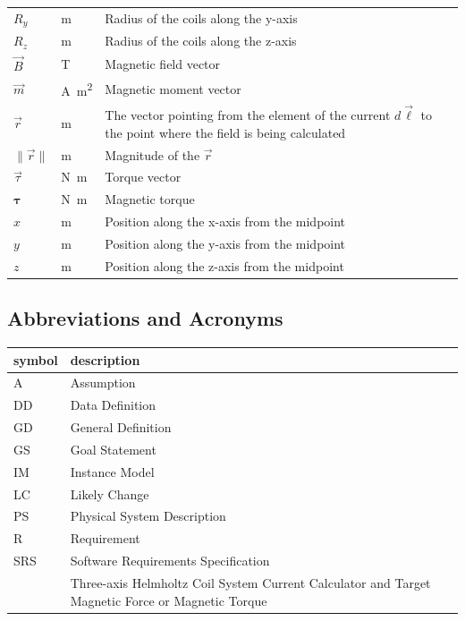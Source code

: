 \documentclass[12pt]{article}
\begin{document}
\begin{longtable*}{l l p{12cm}}
$R_y$ & \si[per-mode=symbol]{\metre} & Radius of the coils along the y-axis \\
$R_z$ & \si[per-mode=symbol]{\metre} & Radius of the coils along the z-axis \\
$\vec{B}$ & \si[per-mode=symbol]{\tesla} & Magnetic field vector \\
$\vec{m}$ & \si[per-mode=symbol]{\ampere\square\meter} & Magnetic moment vector \\
$\vec{r}$ & \si[per-mode=symbol]{\meter} & The vector pointing from the element of the current $d\vec{\ell}$ to the point where the field is being calculated \\
$\|\vec{r}\|$  & \si[per-mode=symbol]{\meter} & Magnitude of the $\vec{r}$ \\
$\vec{\tau}$ & \si[per-mode=symbol]{\newton\meter} & Torque vector \\
$\mathbf{\tau}$ & \si[per-mode=symbol]{\si{\newton\meter}} & Magnetic torque \\
$x$ & \si[per-mode=symbol]{\metre} & Position along the x-axis from the midpoint \\
$y$ & \si[per-mode=symbol]{\metre} & Position along the y-axis from the midpoint \\
$z$ & \si[per-mode=symbol]{\metre} & Position along the z-axis from the midpoint \\

\bottomrule
\end{longtable*}


\subsection{Abbreviations and Acronyms}

\renewcommand{\arraystretch}{1.2}
\begin{tabular}{lp{15cm}} 
  \toprule		
  \textbf{symbol} & \textbf{description}\\
  \midrule 
  A & Assumption\\
  DD & Data Definition\\
  GD & General Definition\\
  GS & Goal Statement\\
  IM & Instance Model\\
  LC & Likely Change\\
  PS & Physical System Description\\
  R & Requirement\\
  SRS & Software Requirements Specification\\
  \progname{} & Three-axis Helmholtz Coil System Current Calculator and Target Magnetic Force or Magnetic Torque\\
  \bottomrule
\end{tabular}\\
\end{document}
